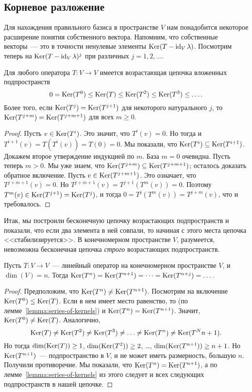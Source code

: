 \subsection{Корневое разложение}



Для нахождения правильного базиса в пространстве $V$ нам понадобится
некоторое расширение понятия собственного вектора.
Напомним, что собственные векторы~--- это в точности ненулевые
элементы $\operatorname{Ker}(T-\operatorname{id}_V\lambda)$. Посмотрим теперь
на $\operatorname{Ker}(T-\operatorname{id}_V\lambda)^j$ при различных $j=1,2,\dots$.
\begin{lemma}\label{lemma:series-of-kernels}
Для любого оператора $T\colon V\to V$ имеется
возрастающая цепочка вложенных подпространств
$$
0 = \operatorname{Ker}(T^0) \leq \operatorname{Ker}(T) \leq \operatorname{Ker}(T^2) \leq \operatorname{Ker}(T^3) \leq \dots.
$$
Более того, если $\operatorname{Ker}(T^j) = \operatorname{Ker}(T^{j+1})$ для некоторого
натурального $j$, то $\operatorname{Ker}(T^{j+m})=\operatorname{Ker}(T^{j+m+1})$ для всех $m\geq0$.
\end{lemma}
\begin{proof}
Пусть $v\in\operatorname{Ker}(T^i)$. Это значит, что $T^i(v)=0$.
Но тогда и $T^{i+1}(v)=T(T^i(v)) = T(0)=0$.
Мы показали, что $\operatorname{Ker}(T^i)\subseteq\operatorname{Ker}(T^{i+1})$.
Докажем второе утверждение индукцией по $m$. База $m=0$ очевидна.
Пусть теперь $m>0$. Мы уже знаем, что $\operatorname{Ker}(T^{j+m})\subseteq
\operatorname{Ker}(T^{j+m+1})$; осталось доказать обратное включение.
Пусть $v\in\operatorname{Ker}(T^{j+m+1})$. Это означает, что
$T^{j+m+1}(v)=0$. Но $T^{j+m+1}(v) = T^{j+1}(T^m(v)) = 0$.
Поэтому $T^m(v)\in\operatorname{Ker}(T^{j+1}) = \operatorname{Ker}(T^j)$,
и тогда $0 = T^j(T^m(v)) = T^{j+m}(v)$, что и требовалось.
\end{proof}

Итак, мы построили бесконечную цепочку возрастающих подпространств
и показали, что если два элемента в ней совпали, то начиная
с этого места цепочка <<стабилизируется>>.
В конечномерном пространстве $V$, разумеется, невозможна
бесконечная цепочка {\em строго} возрастающих подпространств.
\begin{proposition}\label{prop:nilpotence-degree-is-bounded}
Пусть $T\colon V\to V$~--- линейный оператор на конечномерном
пространстве $V$, и $\dim(V) = n$. Тогда
$\operatorname{Ker}(T^n) = \operatorname{Ker}(T^{n+1}) = \dots = \operatorname{Ker}(T^{n+j}) = \dots$.
\end{proposition}
\begin{proof}
Предположим, что $\operatorname{Ker}(T^n)\neq\operatorname{Ker}(T^{n+1})$.
Посмотрим на включение $\operatorname{Ker}(T^0)\leq\operatorname{Ker}(T)$.
Если в нем имеет место равенство, то
(по лемме~\ref{lemma:series-of-kernels}) и $\operatorname{Ker}(T^n)=\operatorname{Ker}(T^{n+1})$.
Значит, $\operatorname{Ker}(T^0)\neq \operatorname{Ker}(T)$. Аналогично,
$$
\operatorname{Ker}(T)\neq\operatorname{Ker}(T^2)\neq\operatorname{Ker}(T^3)\neq\dots\neq\operatorname{Ker}(T^n)\neq\operatorname{Ker}(T^N{n+1}).
$$
Но тогда $\dim(\operatorname{Ker}(T))\geq 1$, $\dim(\operatorname{Ker}(T^2))\geq 2$, \dots,
$\dim(\operatorname{Ker}(T^{n+1})) \geq n+1$. Но $\operatorname{Ker}(T^{n+1})$~--- подпространство
в $V$, и не может иметь размерность, большую $n$.
Получили противоречие.
Мы показали, что $\operatorname{Ker}(T^n) = \operatorname{Ker}(T^{n+1})$, а
по лемме~\ref{lemma:series-of-kernels} из этого следует
и всех следующих подпространств в нашей цепочке.
\end{proof}

